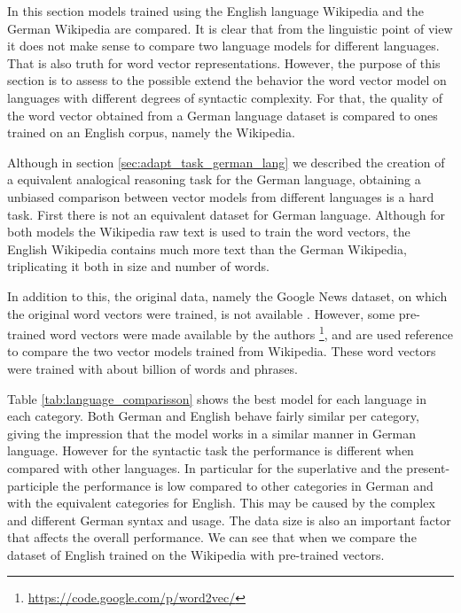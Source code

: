 In this section models trained using the English language Wikipedia and the
German Wikipedia  are compared. It is clear that from the linguistic
point of view it does not make sense to compare two language models for
different languages. That is also truth for  word vector representations. 
However, the purpose of this section is to assess to the  possible extend the
behavior the word vector model  on languages with different
degrees of syntactic complexity. For that, the quality of the word
vector  obtained from a  German language  dataset is compared to  ones trained
on an English corpus, namely the Wikipedia.

Although in section \ref{sec:adapt_task_german_lang} we described the
creation of a  equivalent analogical reasoning task for the German language,
obtaining  a unbiased comparison between vector models from different
languages is a hard task.  First there is not an equivalent dataset for
German language.  Although for both models the Wikipedia raw text is used to
train the word vectors,  the English Wikipedia contains much more
text than the German Wikipedia, triplicating it both in size and  number of words.

In addition to this, the original data, namely the Google News dataset, on
which the original word vectors were trained, is not available
\cite{DBLP:journals/corr/abs-1301-3781}. However, some pre-trained word
vectors were made available by the authors \footnote{\url{https://code.google.com/p/word2vec/}}, and
are used reference to compare the two vector models trained from Wikipedia.
These word vectors were trained with about billion of words and phrases.


Table \ref{tab:language_comparisson} shows  the best model for each language in each
category. Both German and English behave fairly similar per category, giving
the impression that the model works in a similar manner in German language.
However for the syntactic task  the performance is  different when
compared with other languages. In particular for the superlative and the
present-participle  the performance is low compared to other categories in
German and with the  equivalent categories for English. This may be caused by
the complex and different German syntax and usage. The data size is also an
important factor that affects the overall performance.  We can see that when we
compare the dataset of English trained on the Wikipedia with  pre-trained vectors. 


